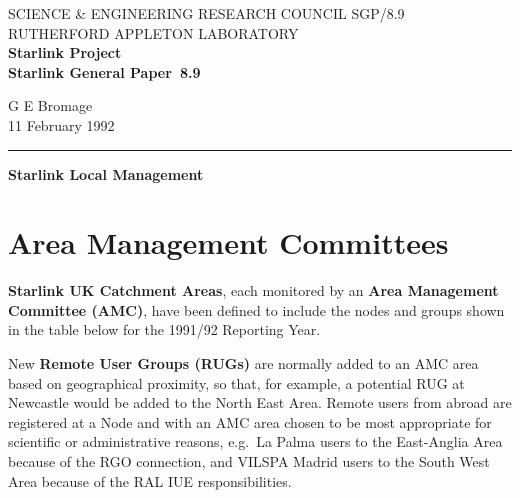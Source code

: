\pagestyle{myheadings}

\newcommand{\stardoccategory}  {Starlink General Paper}
\newcommand{\stardocinitials}  {SGP}
\newcommand{\stardocnumber}    {8.9}
\newcommand{\stardocauthors}   {G E Bromage}
\newcommand{\stardocdate}      {11 February 1992}
\newcommand{\stardoctitle}     {Starlink Local Management}

\newcommand{\stardocname}{\stardocinitials /\stardocnumber}
\renewcommand{\_}{{\tt\char'137}}     %
\markright{\stardocname}
\setlength{\textwidth}{160mm}
\setlength{\textheight}{230mm}
\setlength{\topmargin}{-2mm}
\setlength{\oddsidemargin}{0mm}
\setlength{\evensidemargin}{0mm}
\setlength{\parindent}{0mm}
\setlength{\parskip}{\medskipamount}
\setlength{\unitlength}{1mm}


\thispagestyle{empty}
SCIENCE \& ENGINEERING RESEARCH COUNCIL \hfill \stardocname\\
RUTHERFORD APPLETON LABORATORY\\
{\large\bf Starlink Project\\}
{\large\bf \stardoccategory\ \stardocnumber}
\begin{flushright}
\stardocauthors\\
\stardocdate
\end{flushright}
\vspace{-4mm}
\rule{\textwidth}{0.5mm}
\vspace{5mm}
\begin{center}
{\Large\bf \stardoctitle}
\end{center}
\vspace{5mm}

\section {Area Management Committees}

{\bf Starlink UK Catchment Areas}, each monitored by an {\bf Area Management
Committee (AMC)}, have been defined to include the nodes and groups shown in the
table below for the 1991/92 Reporting Year.

New {\bf Remote User Groups (RUGs)} are normally added to an AMC area based on
geographical proximity, so that, for example, a potential RUG at Newcastle
would be added to the North East Area.
Remote users from abroad are registered at a Node and with an AMC area chosen
to be most appropriate for scientific or administrative reasons, e.g.\ La Palma
users to the East-Anglia Area because of the RGO connection, and VILSPA Madrid
users to the South West Area because of the RAL IUE responsibilities.

